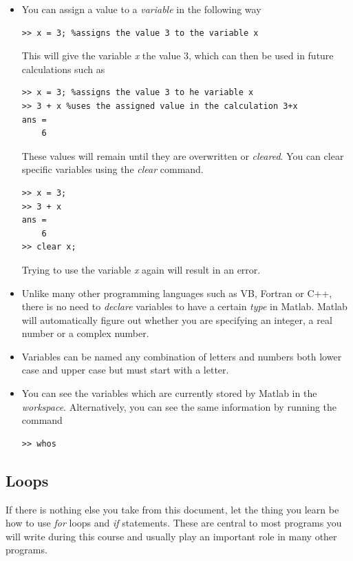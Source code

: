 \documentclass[12pt]{report}
\begin{document}
\begin{itemize}
\item You can assign a value to a \textit{variable} in the following way
%
\begin{lstlisting}
>> x = 3; %assigns the value 3 to the variable x
\end{lstlisting}
%
This will give the variable \textit{x} the value 3, which can then be used in future calculations such as
%
\begin{lstlisting}
>> x = 3; %assigns the value 3 to he variable x
>> 3 + x %uses the assigned value in the calculation 3+x 
ans =
	6
\end{lstlisting}
%
These values will remain until they are overwritten or \textit{cleared}. You can clear specific variables using the \textit{clear} command.
%
\begin{lstlisting}
>> x = 3;
>> 3 + x
ans =
	6
>> clear x;
\end{lstlisting}
%
Trying to use the variable \textit{x} again will result in an error.

\item Unlike many other programming languages such as VB, Fortran or C++, there is no need to \textit{declare} variables to have a certain \textit{type} in Matlab. Matlab will automatically figure out whether you are specifying an integer, a real number or a complex number. 

\item Variables can be named any combination of letters and numbers both lower case and upper case but must start with a letter. 

\item You can see the variables which are currently stored by Matlab in the \textit{workspace}. Alternatively, you can see the same information by running the command
%
\begin{lstlisting}
>> whos
\end{lstlisting}
%
\end{itemize}

\subsection*{Loops}

If there is nothing else you take from this document, let the thing you learn be how to use \textit{for} loops and \textit{if} statements. These are central to most programs you will write during this course and usually play an important role in many other programs.
\end{document}
